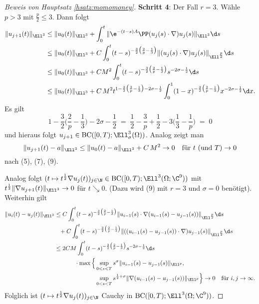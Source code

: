 \begin{proof}[Beweis von Hauptsatz \ref{hsatz:momomoney}]
  \textbf{Schritt 4}:
  Der Fall $r = 3$.
  Wähle $p > 3$ mit $\frac{p}{2} \leq 3$.
  Dann folgt
  \begin{align*}
    \|u_{j + 1}(t) \|_{\Ell^3}
    &\leq \|u_0(t)\|_{\Ell^3} + \int_0^t \|\e^{-(t - s) A} \PP (u_j(s) \cdot \nabla) u_j(s) \|_{\Ell^3} \d s \\
    &\leq \|u_0(t)\|_{\Ell^3} + C \int_0^t (t - s)^{-\frac{3}{2} \big( \frac{2}{p} - \frac{1}{3} \big)} \|(u_j(s) \cdot \nabla) u_j(s) \|_{\Ell^{\frac{p}{2}}} \d s \\
    &\leq \|u_0(t)\|_{\Ell^3} + C M^2 \int_0^t (t - s)^{-\frac{3}{2} \big( \frac{2}{p} - \frac{1}{3}\big)} s^{-2\sigma - \frac{1}{2}} \d s \\
    &\leq \|u_0(t)\|_{\Ell^3} + C \, M^2 t^{1 - \frac{3}{2} \big( \frac{2}{p} - \frac{1}{3} \big) - 2\sigma - \frac{1}{2}} \int_0^1 (1 - x)^{-\frac{3}{2} \big( \frac{2}{p} - \frac{1}{3} \big)} x^{-2\sigma - \frac{1}{2}} \d x.
  \end{align*}
  Es gilt
  $$
  1 - \frac{3}{2} \big( \frac{2}{p} - \frac{1}{3} \big) - 2\sigma - \frac{1}{2}
  \;=\; \frac{1}{2} - \frac{3}{p} + \frac{1}{2} - 3 \big( \frac{1}{3} - \frac{1}{p} \big)
  \;=\; 0
  $$
  und hieraus folgt $u_{j + 1} \in \mathrm{BC}([0,T); \Ell^3_\sigma(\Omega))$.
  Analog zeigt man
  $$
  \|u_{j + 1}(t) - a\|_{\Ell^3}
  \leq \|u_0(t) - a\|_{\Ell^3} + C\, M^2 \to 0 \quad \text{für } t \text{ (und $T$)} \to 0
  $$
  nach (5), (7), (9).

  Analog folgt $(t \mapsto t^{\frac{1}{2}} \nabla u_j(t))_{j \in \N} \in \mathrm{BC}([0,T); \Ell^3(\Omega; \C^9))$ mit $t^{\frac{1}{2}} \|\nabla u_{j + 1}(t) \|_{\Ell^3} \to 0$ für $t \searrow 0$. (Dazu wird (9) mit $r = 3$ und $\sigma = 0$ benötigt).
  Weiterhin gilt
  \begin{align*}
    \|u_i(t) - u_j(t)\|_{\Ell^3}
    &\leq C \int_0^t (t - s)^{-\frac{3}{2} \big( \frac{2}{p} - \frac{1}{3} \big)} \|u_{i - 1}(s) \cdot \nabla (u_{i - 1}(s) - u_{j - 1}(s)) \|_{\Ell^{\frac{p}{2}}} \d s \\
    &\hphantom{\leq} + C \int_0^t (t - s)^{-\frac{3}{2} \big( \frac{2}{p} - \frac{1}{3} \big)} \|((u_{i - 1}(s) - u_{j - 1}(s)) \cdot \nabla) u_{j - 1}(s) \|_{\Ell^{\frac{p}{2}}} \d s \\
    &\leq 2 C M \int_0^t (t - s)^{-\frac{3}{2} \big(\frac{2}{p} - \frac{1}{3} \big)} s^{-2\sigma - \frac{1}{2}} \d s \\
    &\hphantom{\leq 2 C M }\cdot \max \Big\{ \sup_{0 < s < T} s^\sigma \|u_{i - 1}(s) - u_{j - 1}(s) \|_{\Ell^p},\\
    &\hphantom{\leq 2 C M\cdot \max \Big\{ } \sup_{0 < s < T} s^{\frac{1}{2} + \sigma} \|\nabla(u_{i - 1}(s) - u_{j - 1}(s)) \|_{\Ell^p} \Big\} \to 0 \quad\text{für } i,j \to \infty.
  \end{align*}
  Folglich ist $(t \mapsto t^{\frac{1}{2}} \nabla u_j(t))_{j \in \N}$ Cauchy in $\mathrm{BC}([0,T); \Ell^3(\Omega; \C^9))$.
\end{proof}
